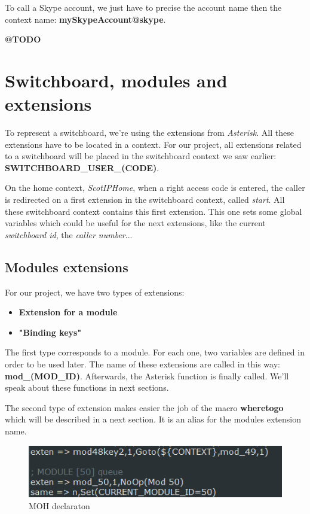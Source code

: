 To call a Skype account, we just have to precise the account name then the context name: \textbf{mySkypeAccount@skype}. 


\textbf{@TODO}

\section{Switchboard, modules and extensions}
To represent a switchboard, we're using the extensions from \textit{Asterisk}. All these extensions have to be located in a context. For our project, all extensions related to a switchboard will be placed in the switchboard context we saw earlier: \textbf{SWITCHBOARD\_USER\_(CODE)}. \newline

On the home context, \textit{ScotIPHome}, when a right access code is entered, the caller is redirected on a first extension in the switchboard context, called \textit{start}.
All these switchboard context contains this first extension. This one sets some global variables which could be useful for the next extensions, like the current \textit{switchboard id}, the \textit{caller number}... \newline

\subsection{Modules extensions}

For our project, we have two types of extensions:
\begin{itemize}
\item \textbf{Extension for a module}
\item \textbf{"Binding keys"}
\end{itemize}

The first type corresponds to a module. For each one, two variables are defined in order to be used later. The name of these extensions are called in this way: \textbf{mod\_(MOD\_ID)}.
Afterwards, the Asterisk function is finally called.  We'll speak about these functions in next sections.
\newline

The second type of extension makes easier the job of the macro \textbf{wheretogo} which will be described in a next section. It is an alias for the modules extension name.



\begin{figure}[H]
  \caption{MOH declaraton}
  \centering
    \includegraphics[width=1\textwidth]{img/modname.png}
\end{figure}



